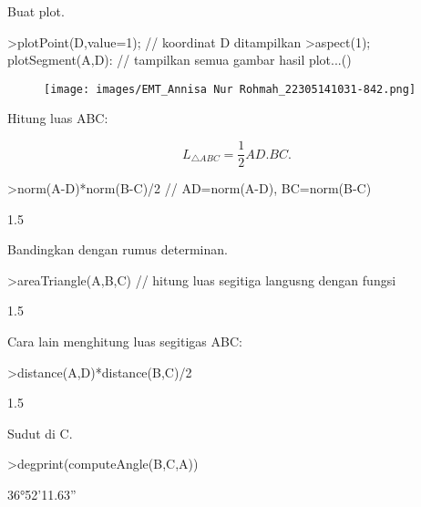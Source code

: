 \documentclass[a4paper,10pt]{article}
\begin{document}
\begin{eulernotebook}
\begin{eulercomment}
\begin{eulercomment}
\begin{eulerprompt}
\end{eulerprompt}
\begin{eulercomment}
Buat plot.
\end{eulercomment}
\begin{eulerprompt}
>plotPoint(D,value=1); // koordinat D ditampilkan
>aspect(1); plotSegment(A,D): // tampilkan semua gambar hasil plot...()
\end{eulerprompt}
\begin{figure}[h]
    \centering
    \texttt{[image: images/EMT\_Annisa Nur Rohmah\_22305141031-842.png]}
\end{figure}
\begin{eulercomment}
Hitung luas ABC:

\end{eulercomment}
\begin{eulerformula}
\[
L_{\triangle ABC}= \frac{1}{2}AD.BC.
\]
\end{eulerformula}
\begin{eulerprompt}
>norm(A-D)*norm(B-C)/2 // AD=norm(A-D), BC=norm(B-C)
\end{eulerprompt}
\begin{euleroutput}
  1.5
\end{euleroutput}
\begin{eulercomment}
Bandingkan dengan rumus determinan.
\end{eulercomment}
\begin{eulerprompt}
>areaTriangle(A,B,C) // hitung luas segitiga langusng dengan fungsi
\end{eulerprompt}
\begin{euleroutput}
  1.5
\end{euleroutput}
\begin{eulercomment}
Cara lain menghitung luas segitigas ABC:
\end{eulercomment}
\begin{eulerprompt}
>distance(A,D)*distance(B,C)/2
\end{eulerprompt}
\begin{euleroutput}
  1.5
\end{euleroutput}
\begin{eulercomment}
Sudut di C.
\end{eulercomment}
\begin{eulerprompt}
>degprint(computeAngle(B,C,A))
\end{eulerprompt}
\begin{euleroutput}
  36°52'11.63''
\end{euleroutput}
\begin{eulercomment}

\end{eulercomment}
\end{eulercomment}
\end{eulercomment}
\end{eulernotebook}
\end{document}
